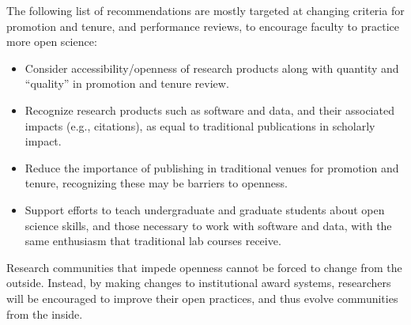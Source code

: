 \documentclass[nobib]{tufte-handout}
\begin{document}
The following list of recommendations are mostly targeted at changing criteria
for promotion and tenure, and performance reviews, to encourage faculty to
practice more open science:
\begin{itemize}
    \item Consider accessibility\slash openness of research products along
    with quantity and ``quality'' in promotion and tenure review.

    \item Recognize research products such as software and data, and their
    associated impacts (e.g., citations), as equal to traditional
    publications in scholarly impact.

    \item Reduce the importance of publishing in traditional venues for promotion
    and tenure, recognizing these may be barriers to openness.

    \item Support efforts to teach undergraduate and graduate students about
    open science skills, and those necessary to work with software and data, with
    the same enthusiasm that traditional lab courses receive.
\end{itemize}
Research communities that impede openness cannot be forced to change from the
outside. Instead, by making changes to institutional award systems, researchers
will be encouraged to improve their open practices, and thus evolve communities
from the inside.

%
%
\printbibliography
\end{document}
